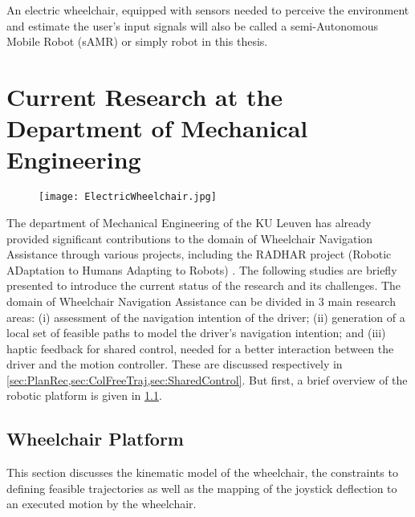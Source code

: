An electric wheelchair, equipped with sensors needed to perceive the environment and estimate the user's input signals will also be called a semi-Autonomous Mobile Robot (sAMR) or simply robot in this thesis.

\newpage

\section{Current Research at the Department of Mechanical Engineering} \label{sec:CurrentResearch}
\begin{figure}[!htbp]
\centering
\texttt{[image: ElectricWheelchair.jpg]}
\end{figure} \noindent
The department of Mechanical Engineering of the KU Leuven has already provided significant contributions to the domain of Wheelchair Navigation Assistance through various projects, including the RADHAR project (Robotic ADaptation to Humans Adapting to Robots) \cite{RADHARWebPage}. The following studies \cite{DemeesterEtAl2012b,DemeesterEtAl2012a,DemeesterEtAl2012,VanderPoortenEtAl2012,VanderPoortenEtAl2012a} are briefly presented to introduce the current status of the research and its challenges. The domain of Wheelchair Navigation Assistance can be divided in 3 main research areas: (i) assessment of the navigation intention of the driver; (ii) generation of a local set of feasible paths to model the driver’s navigation intention; and (iii) haptic feedback for shared control, needed for a better interaction between the driver and the motion controller. These are discussed respectively in \cref{sec:PlanRec,sec:ColFreeTraj,sec:SharedControl}. But first, a brief overview of the robotic platform is given in \cref{sec:WheelchairPlatform}.

\subsection{Wheelchair Platform} \label{sec:WheelchairPlatform}
This section discusses the kinematic model of the wheelchair, the constraints to defining feasible trajectories as well as the mapping of the joystick deflection to an executed motion by the wheelchair.
